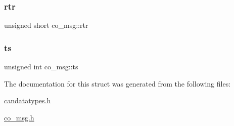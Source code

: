 \mbox{\label{structco__msg_a4352880745fa6bc63d6c4e3c77870029}} 
\subsubsection{\texorpdfstring{rtr}{rtr}}
{\footnotesize\ttfamily unsigned short co\+\_\+msg\+::rtr}

\mbox{\label{structco__msg_aaf8cd43d17baf495c982c87866fc90b2}} 
\subsubsection{\texorpdfstring{ts}{ts}}
{\footnotesize\ttfamily unsigned int co\+\_\+msg\+::ts}



The documentation for this struct was generated from the following files\+:\begin{DoxyCompactItemize}
\item 
\hyperlink{candatatypes_8h}{candatatypes.\+h}\item 
\hyperlink{co__msg_8h}{co\+\_\+msg.\+h}\end{DoxyCompactItemize}
